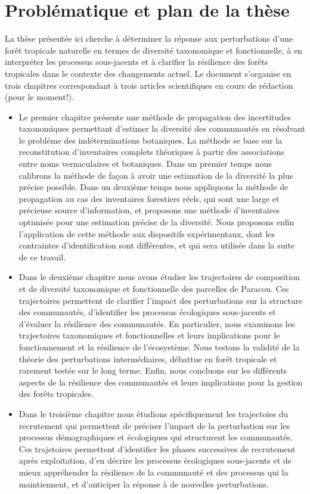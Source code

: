 \documentclass[11pt,french,A4paper,extrafontsizes,onecolumn,openright]{memoir}
\begin{document}
\section{Problématique et plan de la
thèse}\label{problematique-et-plan-de-la-these}

La thèse présentée ici cherche à déterminer la réponse aux perturbations
d'une forêt tropicale naturelle en termes de diversité taxonomique et
fonctionnelle, à en interpréter les processus sous-jacents et à
clarifier la résilience des forêts tropicales dans le contexte des
changements actuel. Le document s'organise en trois chapitres
correspondant à trois articles scientifiques en cours de rédaction (pour
le moment!).

\begin{itemize}
\item
  Le premier chapitre présente une méthode de propagation des
  incertitudes taxonomiques permettant d'estimer la diversité des
  communautés en résolvant le problème des indéterminations botaniques.
  La méthode se base sur la reconstitution d'inventaires complets
  théoriques à partir des associations entre noms vernaculaires et
  botaniques. Dans un premier temps nous calibrons la méthode de façon à
  avoir une estimation de la diversité la plus précise possible. Dans un
  deuxième temps nous appliquons la méthode de propagation au cas des
  inventaires forestiers réels, qui sont une large et précieuse source
  d'information, et proposons une méthode d'inventaires optimisée pour
  une estimation précise de la diversité. Nous proposons enfin
  l'application de cette méthode aux dispositifs expérimentaux, dont les
  contraintes d'identification sont différentes, et qui sera utilisée
  dans la suite de ce travail.
\item
  Dans le deuxième chapitre nous avons étudier les trajectoires de
  composition et de diversité taxonomique et fonctionnelle des parcelles
  de Paracou. Ces trajectoires permettent de clarifier l'impact des
  perturbations sur la structure des communautés, d'identifier les
  processus écologiques sous-jacents et d'évaluer la résilience des
  communautés. En particulier, nous examinons les trajectoires
  taxonomiques et fonctionnelles et leurs implications pour le
  fonctionnement et la résilience de l'écosystème. Nous testons la
  validité de la théorie des perturbations intermédiaires, débattue en
  forêt tropicale et rarement testée sur le long terme. Enfin, nous
  concluons sur les différents aspects de la résilience des communautés
  et leurs implications pour la gestion des forêts tropicales.
\item
  Dans le troisième chapitre nous étudions spécifiquement les
  trajectoies du recrutement qui permettent de préciser l'impact de la
  perturbation sur les processus démographiques et écologiques qui
  structurent les communautés. Ces trajetoires permettent d'identifier
  les phases successives de recrutement après exploitation, d'en décrire
  les processus écologiques sous-jacents et de mieux appréhender la
  résilience de la communauté et des processus qui la maintiennent, et
  d'anticiper la réponse à de nouvelles perturbations.
\end{itemize}
\end{document}
